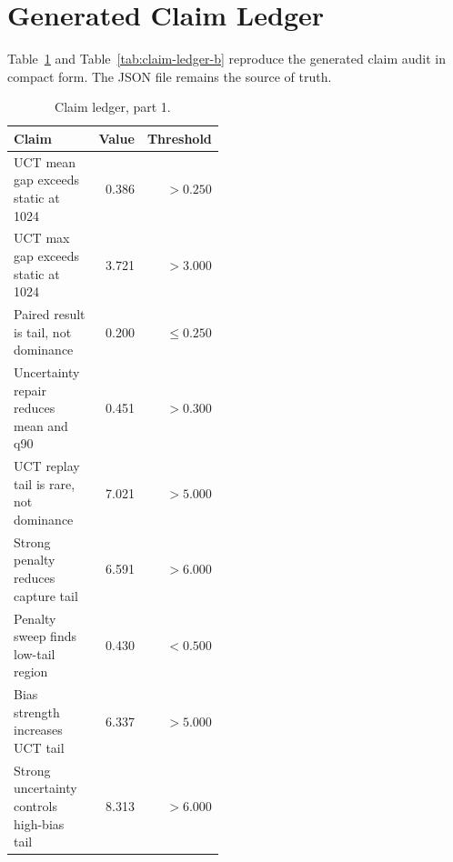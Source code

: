 \documentclass{article}
\begin{document}
\clearpage



\clearpage
\appendix

\section{Generated Claim Ledger}

Table~\ref{tab:claim-ledger-a} and Table~\ref{tab:claim-ledger-b} reproduce the generated claim audit in compact form. The JSON file remains the source of truth.

\begin{table}[htbp]
\caption{Claim ledger, part 1.}
\label{tab:claim-ledger-a}
\begin{center}
\small
\begin{tabular}{p{0.46\linewidth}rr}
\toprule
Claim & Value & Threshold \\
\midrule
UCT mean gap exceeds static at 1024 & 0.386 & \(>0.250\) \\
UCT max gap exceeds static at 1024 & 3.721 & \(>3.000\) \\
Paired result is tail, not dominance & 0.200 & \(\le 0.250\) \\
Uncertainty repair reduces mean and q90 & 0.451 & \(>0.300\) \\
UCT replay tail is rare, not dominance & 7.021 & \(>5.000\) \\
Strong penalty reduces capture tail & 6.591 & \(>6.000\) \\
Penalty sweep finds low-tail region & 0.430 & \(<0.500\) \\
Bias strength increases UCT tail & 6.337 & \(>5.000\) \\
Strong uncertainty controls high-bias tail & 8.313 & \(>6.000\) \\
\bottomrule
\end{tabular}
\end{center}
\end{table}
\end{document}
